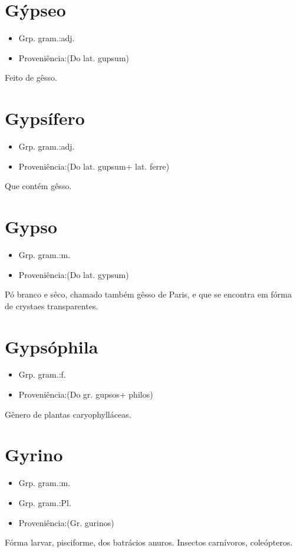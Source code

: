\section{Gýpseo}
\begin{itemize}
\item {Grp. gram.:adj.}
\end{itemize}
\begin{itemize}
\item {Proveniência:(Do lat. \textunderscore gupsum\textunderscore )}
\end{itemize}
Feito de gêsso.
\section{Gypsífero}
\begin{itemize}
\item {Grp. gram.:adj.}
\end{itemize}
\begin{itemize}
\item {Proveniência:(Do lat. \textunderscore gupsum\textunderscore  + lat. \textunderscore ferre\textunderscore )}
\end{itemize}
Que contém gêsso.
\section{Gypso}
\begin{itemize}
\item {Grp. gram.:m.}
\end{itemize}
\begin{itemize}
\item {Proveniência:(Do lat. \textunderscore gypsum\textunderscore )}
\end{itemize}
Pó branco e sêco, chamado também \textunderscore gêsso de Paris\textunderscore , e que se encontra em fórma de crystaes transparentes.
\section{Gypsóphila}
\begin{itemize}
\item {Grp. gram.:f.}
\end{itemize}
\begin{itemize}
\item {Proveniência:(Do gr. \textunderscore gupsos\textunderscore  + \textunderscore philos\textunderscore )}
\end{itemize}
Gênero de plantas caryophylláceas.
\section{Gyrino}
\begin{itemize}
\item {Grp. gram.:m.}
\end{itemize}
\begin{itemize}
\item {Grp. gram.:Pl.}
\end{itemize}
\begin{itemize}
\item {Proveniência:(Gr. \textunderscore gurinos\textunderscore )}
\end{itemize}
Fórma larvar, pisciforme, dos batrácios anuros.
Insectos carnívoros, coleópteros.
